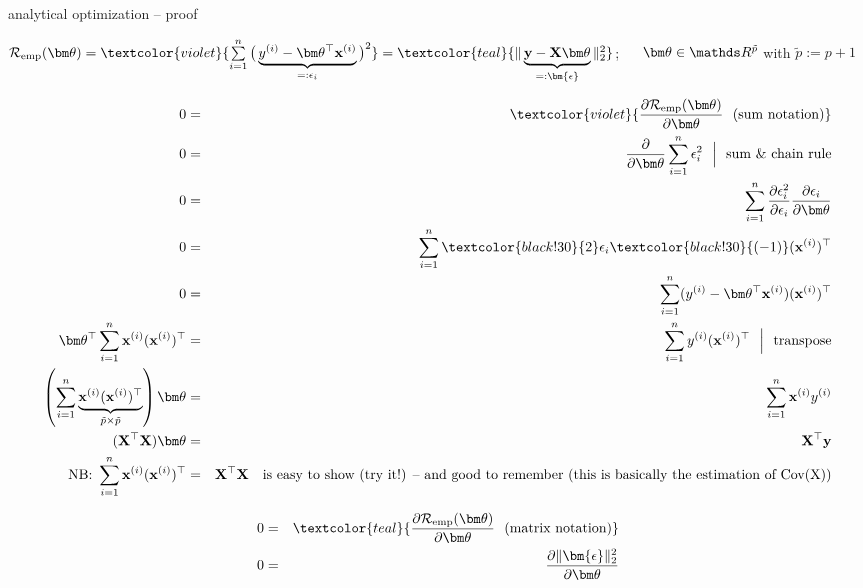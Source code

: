 \documentclass[11pt,compress,t,notes=noshow, xcolor=table]{beamer}
\begin{document}
\begin{vbframe}{analytical optimization -- proof}

\scriptsize
$\risket = \textcolor{violet}{\sumin \big(\underbrace{\yi - \thetav^\top \xi}_{=:
\epsilon_i} \big)^2}
= \textcolor{teal}{\| \underbrace{\yv - \Xmat \thetav}_{=: \bm{\epsilon}} 
\|^2_2}$; ~~ $\thetav \in \R^{\tilde p}$ with $\tilde p := p + 1$


\begin{minipage}[t]{0.52\textwidth}
    \tiny 
    \begin{eqnarray*}
        0 &=& \textcolor{violet}{\frac{\partial \risket}{\partial \thetav}
        ~~ \text{(sum notation)}} \\
        0 &=& \frac{\partial}{\partial \thetav} \sumin \epsilon_i^2 
        ~~ \Big \rvert
        ~~ \text{sum \& chain rule} \\
        0 &=& \sumin \frac{\partial \epsilon_i^2}{\partial \epsilon_i}
        \frac{\partial \epsilon_i}{\partial \thetav} \\
        0 &=& \sumin \textcolor{black!30}{2} \epsilon_i 
        \textcolor{black!30}{(-1)} (\xi)^\top \\ 
        0 &=& \sumin (\yi - \thetav^\top \xi)(\xi)^\top \\
        \thetav^\top \sumin  \xi (\xi)^\top &=&\sumin \yi (\xi)^\top 
        ~~ \Big \rvert ~~ \text{transpose} \\
        \left( \sumin \underbrace{\xi (\xi)^\top }_{\tilde p \times \tilde p}\right) \thetav &=& 
        \sumin \xi \yi \\
        (\Xmat^\top \Xmat) \thetav &=&  \Xmat^\top \yv \\
        \text{NB: } \sumin \xi (\xi)^\top &=& \Xmat^\top \Xmat \quad \text{is easy to show (try it!) -- and good to remember (this is basically the estimation of Cov(X))}
    \end{eqnarray*}
\end{minipage}
\hfill
\begin{minipage}[t]{0.45\textwidth}
    \tiny 
    \begin{eqnarray*}
        0 &=& \textcolor{teal}{\frac{\partial \risket}{\partial \thetav}
        ~~ \text{(matrix notation)}} \\
        0 &=& \frac{\partial \| \bm{\epsilon} \|_2^2 }{\partial \thetav} \\

\end{eqnarray*}
\end{minipage}
\end{vbframe}
\end{document}
